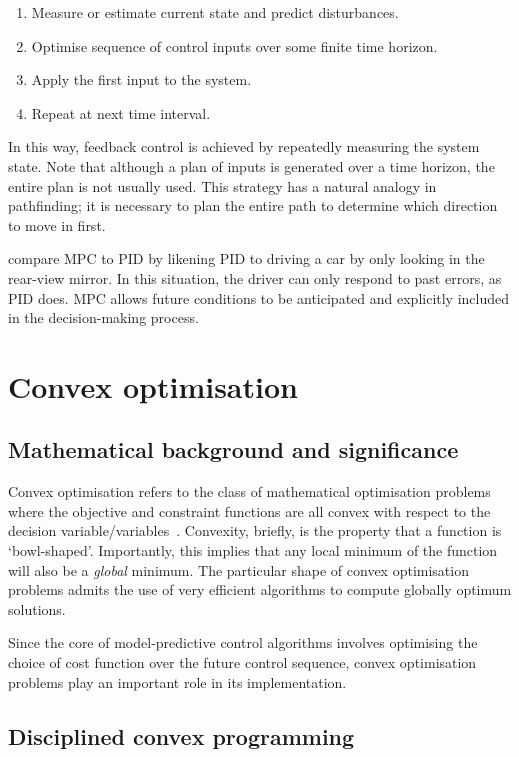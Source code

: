 \begin{enumerate}
   \item Measure or estimate current state and predict disturbances.
   \item Optimise sequence of control inputs over some finite time horizon.
   \item Apply the first input to the system.
   \item Repeat at next time interval.
\end{enumerate}

In this way, feedback control is achieved by repeatedly measuring the system state.
Note that although a plan of inputs is generated over a time horizon, the entire plan is not usually used.
This strategy has a natural analogy in pathfinding; it is necessary to plan the entire path to determine which direction to move in first.

 compare MPC to PID by likening PID to driving a car by only looking in the rear-view mirror.
In this situation, the driver can only respond to past errors, as PID does.
MPC allows future conditions to be anticipated and explicitly included in the decision-making process.

\section{Convex optimisation}

\subsection{Mathematical background and significance}

Convex optimisation refers to the class of mathematical optimisation problems where the objective and constraint functions are all convex with respect to the decision variable/variables~\cite{Boyd04}.
Convexity, briefly, is the property that a function is `bowl-shaped'.
Importantly, this implies that any local minimum of the function will also be a \emph{global} minimum.
The particular shape of convex optimisation problems admits the use of very efficient algorithms to compute globally optimum solutions.

Since the core of model-predictive control algorithms involves optimising the choice of cost function over the future control sequence, convex optimisation problems play an important role in its implementation.

\subsection{Disciplined convex programming}

